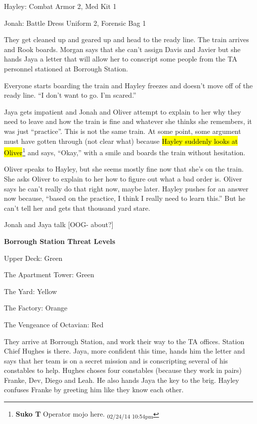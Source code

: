 Hayley: Combat Armor 2, Med Kit 1

Jonah: Battle Dress Uniform 2, Forensic Bag 1



They get cleaned up and geared up and head to the ready line.  The train arrives and Rook boards.  Morgan says that she can't assign Davis and Javier but she hands Jaya a letter that will allow her to conscript some people from the TA personnel stationed at Borrough Station.



Everyone starts boarding the train and Hayley freezes and doesn't move off of the ready line.  ``I don't want to go.  I'm scared.''



Jaya gets impatient and Jonah and Oliver attempt to explain to her why they need to leave and how the train is fine and whatever she thinks she remembers, it was just ``practice''.  This is not the same train.  At some point, some argument must have gotten through (not clear what) because \hl{Hayley suddenly looks at Oliver}\footnote{\textbf{Suko T }Operator mojo here. \textsubscript{02/24/14 10:54pm}} and says, ``Okay,'' with a smile and boards the train without hesitation.



Oliver speaks to Hayley, but she seems mostly fine now that she's on the train.  She asks Oliver to explain to her how to figure out what a bad order is.  Oliver says he can't really do that right now, maybe later.  Hayley pushes for an answer now because, ``based on the practice, I think I really need to learn this.''  But he can't tell her and gets that thousand yard stare.



Jonah and Jaya talk {[}OOG- about?{]}





\textbf{Borrough Station Threat Levels }

{
\parskip=0pt
Upper Deck: Green

The Apartment Tower: Green

The Yard: Yellow

The Factory: Orange

The Vengeance of Octavian: Red
}


They arrive at Borrough Station, and work their way to the TA offices.  Station Chief Hughes is there.  Jaya, more confident this time, hands him the letter and says that her team is on a secret mission and is conscripting several of his constables to help.  Hughes choses four constables (because they work in pairs) Franke, Dev, Diego and Leah.  He also hands Jaya the key to the brig.  Hayley confuses Franke by greeting him like they know each other.




